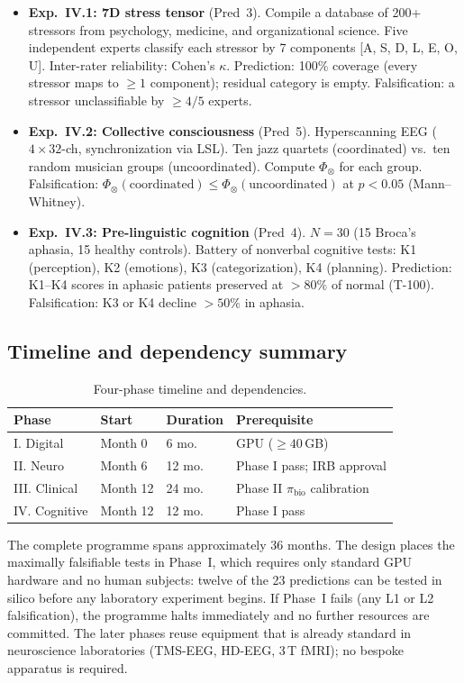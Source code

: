\begin{itemize}[leftmargin=2em]
  \item \textbf{Exp.~IV.1: 7D stress tensor} (Pred~3). Compile a database of 200+
        stressors from psychology, medicine, and organizational science. Five independent
        experts classify each stressor by 7 components [A, S, D, L, E, O, U]. Inter-rater
        reliability: Cohen's $\kappa$. Prediction: 100\% coverage (every stressor maps to
        $\geq 1$ component); residual category is empty. Falsification: a stressor
        unclassifiable by $\geq 4/5$ experts.
  \item \textbf{Exp.~IV.2: Collective consciousness} (Pred~5). Hyperscanning EEG
        ($4 \times 32$-ch, synchronization via LSL). Ten jazz quartets (coordinated) vs.\
        ten random musician groups (uncoordinated). Compute $\Phi_\otimes$ for each group.
        Falsification: $\Phi_\otimes(\mathrm{coordinated}) \leq
        \Phi_\otimes(\mathrm{uncoordinated})$ at $p < 0.05$ (Mann--Whitney).
  \item \textbf{Exp.~IV.3: Pre-linguistic cognition} (Pred~4). $N = 30$ (15 Broca's aphasia,
        15 healthy controls). Battery of nonverbal cognitive tests: K1 (perception),
        K2 (emotions), K3 (categorization), K4 (planning). Prediction: K1--K4 scores in
        aphasic patients preserved at $> 80\%$ of normal (T-100). Falsification: K3 or K4
        decline $> 50\%$ in aphasia.
\end{itemize}

\subsection{Timeline and dependency summary}

\begin{table}[H]
\centering
\caption{Four-phase timeline and dependencies.}
\label{tab:timeline}
\begin{tabular}{@{}llll@{}}
\toprule
\textbf{Phase} & \textbf{Start} & \textbf{Duration} & \textbf{Prerequisite} \\
\midrule
I. Digital   & Month 0  & 6 mo.  & GPU ($\geq 40$\,GB) \\
II. Neuro    & Month 6  & 12 mo. & Phase I pass; IRB approval \\
III. Clinical & Month 12 & 24 mo. & Phase II $\pi_{\mathrm{bio}}$ calibration \\
IV. Cognitive & Month 12 & 12 mo. & Phase I pass \\
\bottomrule
\end{tabular}
\end{table}

\noindent
The complete programme spans approximately 36 months. The design places the
maximally falsifiable tests in Phase~I, which requires only standard GPU
hardware and no human subjects: twelve of the 23 predictions can be tested
in silico before any laboratory experiment begins. If Phase~I fails (any
L1 or L2 falsification), the programme halts immediately and no further
resources are committed. The later phases reuse equipment that is already
standard in neuroscience laboratories (TMS-EEG, HD-EEG, 3\,T fMRI); no
bespoke apparatus is required.
